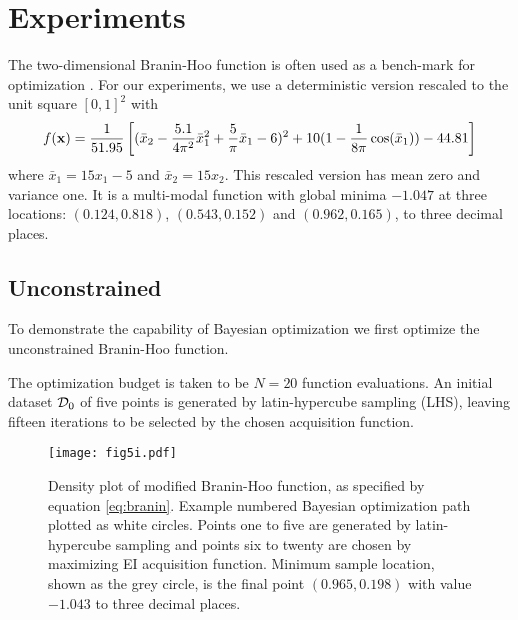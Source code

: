 
\chapter{Experiments} %

\label{Chapter5} %


The two-dimensional Branin-Hoo function is often used as a bench-mark for optimization \cite{eggensperger2013towards} \cite{picheny2013benchmark}. For our experiments, we use a deterministic version \cite{sfu} rescaled to the unit square $[0,1]^2$ with
%
\begin{equation} \label{eq:branin}
f(\mathbf{x}) = \frac{1}{51.95} \left[ (\bar{x}_2 - \frac{5.1}{4\pi^2}\bar{x}_1^2 + \frac{5}{\pi}\bar{x}_1 - 6)^2 + 10(1-\frac{1}{8\pi}\cos(\bar{x}_1)) - 44.81 \right] 
\end{equation} 
%
where $\bar{x}_1 = 15x_1 - 5$ and $\bar{x}_2 = 15x_2$. This rescaled version has mean zero and variance one. It is a multi-modal function with global minima $-1.047$ at three locations: $(0.124, 0.818)$, $(0.543, 0.152)$ and $(0.962, 0.165)$, to three decimal places.

\section{Unconstrained} \label{experiment1}

To demonstrate the capability of Bayesian optimization we first optimize the unconstrained Branin-Hoo function. 

The optimization budget is taken to be $N = 20$ function evaluations. An initial dataset $\mathcal{D}_0$ of five points is generated by latin-hypercube sampling (LHS), leaving fifteen iterations to be selected by the chosen acquisition function.

\begin{figure}
\centering
\texttt{[image: fig5i.pdf]}
\caption{Density plot of modified Branin-Hoo function, as specified by equation \ref{eq:branin}. Example numbered Bayesian optimization path plotted as white circles. Points one to five are generated by latin-hypercube sampling and points six to twenty are chosen by maximizing EI acquisition function. Minimum sample location, shown as the grey circle, is the final point $(0.965, 0.198)$ with value $-1.043$ to three decimal places.} \label{fig:5i}
\end{figure}

